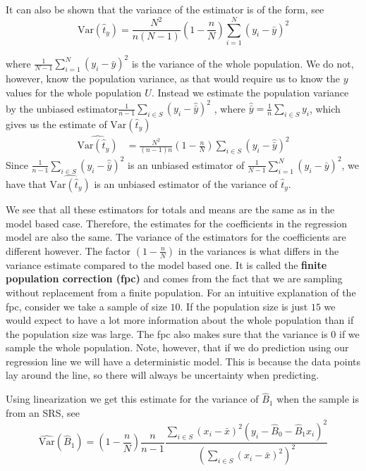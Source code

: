 \documentclass{article}
\begin{document}
It can also be shown that the variance of the estimator is of the form, see
\cite[Chapter 2]{sampReg} \begin{equation*}
\mathrm{Var} \left( \hat{t}_y \right) = \frac{N^2}{n \left( N - 1 \right)} \left( 1 - \frac{n}{N} \right) \sum_{i = 1}^N (y_i - \bar{y})^2 
\end{equation*}

where
\(
\frac{1}{N - 1} \sum_{i = 1}^N (y_i - \bar{y})^2
\)
is the variance of the whole population.
We do not, however, know the population variance, as that would require us to know the \(y\) values
for the whole population \(U\). Instead we estimate the population variance by the unbiased estimator\(
 \frac{1}{n - 1} \sum_{i \in S} \left( y_i - \hat{\bar{y}} \right)^2
\)
, where \(\hat{\bar{y}} = \frac{1}{n} \sum_{i \in S} y_i \), which gives us the estimate of \(\mathrm{Var}(\hat{t}_y)\)\begin{align*}
 \widehat{\mathrm{Var}(\hat{t}_y)}
 &=\frac{N^2}{\left( n - 1 \right)n} \left( 1 - \frac{n}{N} \right) \sum_{i \in S} \left( y_i - \hat{\bar{y}} \right)^2
\end{align*}
Since \(\frac{1}{n - 1} \sum_{i \in S} \left( y_i - \hat{\bar{y}} \right)^2\) is
an unbiased estimator of \(\frac{1}{N - 1} \sum_{i = 1}^N (y_i - \bar{y})^2\), we have that \(\widehat{\mathrm{Var}(\hat{t}_y)}\) is an unbiased estimator of the variance of \(\hat{t}_y\).

We see that all these estimators for totals and means are the same as in the
model based case. Therefore, the estimates for the coefficients in the regression
model are also the same. The variance of the estimators for the coefficients are
different however.
The factor \(\left( 1 - \frac{n}{N} \right)\) in the variances is what differs in
the variance estimate compared to the model based one. It is called the
\textbf{finite population correction (fpc)} and comes from the fact that we are
sampling without replacement from a finite population.
For an intuitive explanation of the fpc, consider we take a sample of size
\(10\). If the population size is just \(15\) we would expect to have a lot more
information about the whole population than if the population size was large.
The fpc also makes sure that the variance is \(0\) if we sample the whole
population. Note, however, that if we do prediction using our regression line
we will have a deterministic model. This is because the data points lay around
the line, so there will always be uncertainty when predicting.

Using linearization we get this estimate for the variance of \(\hat{B}_1\) when
the sample is from an SRS, see \cite[Chapter 11.2]{sampReg}  \begin{equation*}
\widehat{\mathrm{Var}}(\hat{B}_1) = \left( 1 - \frac{n}{N} \right) \frac{n}{n - 1} \frac{\sum_{i \in S} \left( x_i - \bar{x} \right)^2 \left( y_i - \hat{B}_0 - \hat{B}_1 x_i \right)^2}
{\left( \sum_{i \in S} \left( x_i - \bar{x} \right)^2 \right)^2}
\end{equation*}
\end{document}
